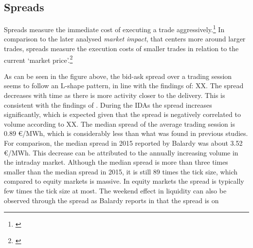 \documentclass[12pt,a4paper]{cau_thesis}
\begin{document}
\subsection{Spreads}\label{sub_sec:spreads}
Spreads measure the immediate cost of executing a trade
aggressively.\footnote{\cite[See ][, p.70]{cartea2015algorithmic}} In
comparison to the later analysed \emph{market impact}, that centers
more around larger trades, spreads measure the execution costs of
smaller trades in relation to the current `market
price'.\footnote{\cite[See ][, p.71]{cartea2015algorithmic}}
\begin{figure}[htbp]
    \vspace*{0.5cm}
    \centering
    \label{fig:bid_ask_spread}
\end{figure}
As can be seen in the figure above, the bid-ask spread over a trading
session seems to follow an L-shape pattern, in line with the findings
of: XX. The spread decreases with time as there is more activity
closer to the delivery. This is consistent with the findings of
\cite[See ][, p.238]{balardy2022empirical}. During the IDAs the
spread increases significantly, which is expected given that the
spread is negatively correlated to volume according to XX. The median
spread of the average trading session is 0.89 €/MWh, which is
considerably less than what was found in previous studies. For
comparison, the median spread in 2015 reported by Balardy was about
3.52 €/MWh. This decrease can be attributed to the annually
increasing volume in the intraday market. Although the median spread
is more than three times smaller than the median spread in 2015, it
is still 89 times the tick size, which compared to equity markets is
massive. In equity markets the spread is typically few times the tick
size at most. The weekend effect in liquidity can also be observed
through the spread as Balardy reports in that the spread is on
\end{document}
